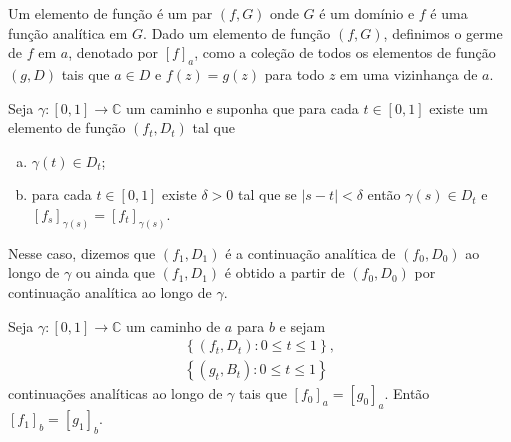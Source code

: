 
\begin{definicao}
\label{def-elemento-funcao}
Um elemento de função é um par $(f, G)$ onde $G$ é um domínio e $f$
é uma função analítica em $G$. Dado um elemento de função $(f,G)$, 
definimos o germe de $f$ em $a$, denotado por $[f]_a$, 
como a coleção de todos os elementos de função $(g,D)$ tais que 
$a\in D$ e $f(z) = g(z)$ para todo $z$ em uma vizinhança de $a$.
\end{definicao}


\begin{definicao}
\label{def-continuacao-analitica}
Seja $\gamma: [0,1] \to \mathbb{C}$ um caminho e suponha que para cada
$t\in[0,1]$ existe um elemento de função $(f_t, D_t)$ tal que
\begin{enumerate}[(a)]
    \item $\gamma(t) \in D_t$;
    \item para cada $t\in[0,1]$ existe $\delta > 0$ tal que se $|s-t| < \delta$
    então $\gamma(s) \in D_t$ e $[f_s]_{\gamma(s)} = [f_t]_{\gamma(s)}$.
\end{enumerate}
Nesse caso, dizemos que $(f_1, D_1)$ é a continuação analítica de $(f_0,D_0)$ ao 
longo de $\gamma$ ou ainda que $(f_1, D_1)$ é obtido a partir de $(f_0,D_0)$ por
continuação analítica ao longo de $\gamma$.
\end{definicao}


\begin{proposicao}
\label{prop-unicidade-continuacao-analitica-caminho}
Seja $\gamma: [0,1]\to\mathbb{C}$ um caminho de $a$ para $b$ e sejam
\begin{align*}
    \left\{ (f_t, D_t): 0\leq t\leq 1 \right\}, \\
    \left\{ (g_t, B_t): 0\leq t\leq 1 \right\}
\end{align*}
continuações analíticas ao longo de $\gamma$ tais que $[f_0]_a = [g_0]_a$.
Então $[f_1]_b = [g_1]_b$.
\end{proposicao}

